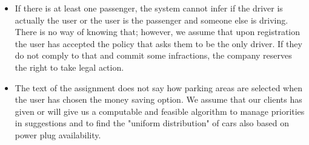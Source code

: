 \begin{itemize}
				\item If there is at least one passenger, the system cannot infer if the driver is actually the user or the user is the passenger and someone else is driving. There is no way of knowing that; however, we assume that upon registration the user has accepted the policy that asks them to be the only driver. If they do not comply to that and commit some infractions, the company reserves the right to take legal action. 
				
				\item The text of the assignment does not say how parking areas are selected when the user has chosen the money saving option. We assume that our clients has given or will give us a computable and feasible algorithm to manage priorities in suggestions and to find the "uniform distribution" of cars also based on power plug availability. 

			\end{itemize}
